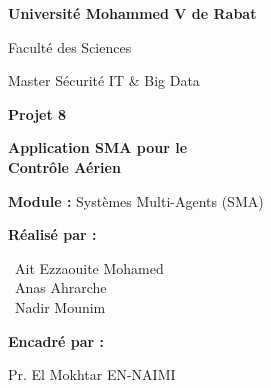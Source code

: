\documentclass[12pt,a4paper]{article}
\begin{document}
\begin{titlepage}

    \centering
    \vspace*{1.5cm}

    {\color{white}\LARGE\bfseries Université Mohammed V de Rabat\par}
    \vspace{0.3cm}
    {\color{white}\Large Faculté des Sciences\par}
    \vspace{0.5cm}
    {\color{white}\large Master Sécurité IT \& Big Data\par}

    \vspace{3cm}

    {\color{primaryblue}\Huge\bfseries Projet 8\par}
    \vspace{0.8cm}
    {\color{darkblue}\LARGE\bfseries Application SMA pour le\\Contrôle Aérien\par}

    \vspace{1cm}
    \begin{tcolorbox}[colback=lightblue!30, colframe=primaryblue, width=0.8\textwidth, arc=5mm, boxrule=1.5pt]
        \centering
        \large\textbf{Module :} Systèmes Multi-Agents (SMA)
    \end{tcolorbox}

    \vspace{2cm}

    \begin{minipage}{0.45\textwidth}
        \begin{flushleft}
            {\Large\textbf{\color{primaryblue}Réalisé par :}\par}
            \vspace{0.5cm}
            {\large
                \textbullet~Ait Ezzaouite Mohamed\\[0.3cm]
                \textbullet~Anas Ahrarche\\[0.3cm]
                \textbullet~Nadir Mounim\par
            }
        \end{flushleft}
    \end{minipage}%
    \hfill
    \begin{minipage}{0.45\textwidth}
        \begin{flushright}
            {\Large\textbf{\color{primaryblue}Encadré par :}\par}
            \vspace{0.5cm}
            {\large
                Pr. El Mokhtar EN-NAIMI\par
            }
        \end{flushright}
    \end{minipage}


\end{titlepage}
\end{document}
